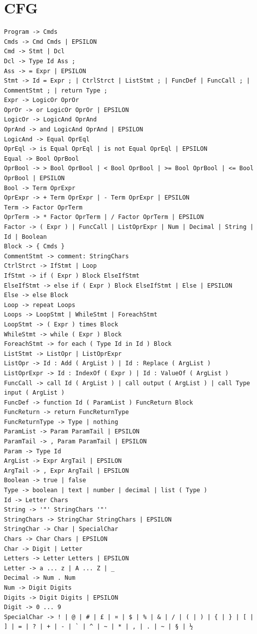 \chapter{CFG} \label{chap:appa}
\begin{lstlisting}[language=scriptkid, label={list:BNFCFG},caption=Context-free grammar for \lang in BNF form]
Program -> Cmds   
Cmds -> Cmd Cmds | EPSILON   
Cmd -> Stmt | Dcl   
Dcl -> Type Id Ass ;   
Ass -> = Expr | EPSILON   
Stmt -> Id = Expr ; | CtrlStrct | ListStmt ; | FuncDef | FuncCall ; | CommentStmt ; | return Type ; 
Expr -> LogicOr OprOr   
OprOr -> or LogicOr OprOr | EPSILON   
LogicOr -> LogicAnd OprAnd   
OprAnd -> and LogicAnd OprAnd | EPSILON   
LogicAnd -> Equal OprEql   
OprEql -> is Equal OprEql | is not Equal OprEql | EPSILON   
Equal -> Bool OprBool   
OprBool -> > Bool OprBool | < Bool OprBool | >= Bool OprBool | <= Bool OprBool | EPSILON   
Bool -> Term OprExpr   
OprExpr -> + Term OprExpr | - Term OprExpr | EPSILON   
Term -> Factor OprTerm   
OprTerm -> * Factor OprTerm | / Factor OprTerm | EPSILON 
Factor -> ( Expr ) | FuncCall | ListOprExpr | Num | Decimal | String | Id | Boolean 
Block -> { Cmds } 
CommentStmt -> comment: StringChars 
CtrlStrct -> IfStmt | Loop   
IfStmt -> if ( Expr ) Block ElseIfStmt   
ElseIfStmt -> else if ( Expr ) Block ElseIfStmt | Else | EPSILON   
Else -> else Block   
Loop -> repeat Loops   
Loops -> LoopStmt | WhileStmt | ForeachStmt   
LoopStmt -> ( Expr ) times Block 
WhileStmt -> while ( Expr ) Block   
ForeachStmt -> for each ( Type Id in Id ) Block   
ListStmt -> ListOpr | ListOprExpr 
ListOpr -> Id : Add ( ArgList ) | Id : Replace ( ArgList ) 
ListOprExpr -> Id : IndexOf ( Expr ) | Id : ValueOf ( ArgList ) 
FuncCall -> call Id ( ArgList ) | call output ( ArgList ) | call Type input ( ArgList ) 
FuncDef -> function Id ( ParamList ) FuncReturn Block   
FuncReturn -> return FuncReturnType   
FuncReturnType -> Type | nothing   
ParamList -> Param ParamTail | EPSILON   
ParamTail -> , Param ParamTail | EPSILON   
Param -> Type Id   
ArgList -> Expr ArgTail | EPSILON   
ArgTail -> , Expr ArgTail | EPSILON   
Boolean -> true | false   
Type -> boolean | text | number | decimal | list ( Type )   
Id -> Letter Chars 
String -> '"' StringChars '"'  
StringChars -> StringChar StringChars | EPSILON 
StringChar -> Char | SpecialChar  
Chars -> Char Chars | EPSILON  
Char -> Digit | Letter   
Letters -> Letter Letters | EPSILON   
Letter -> a ... z | A ... Z | _   
Decimal -> Num . Num 
Num -> Digit Digits   
Digits -> Digit Digits | EPSILON   
Digit -> 0 ... 9 
SpecialChar -> ! | @ | # | £ | ¤ | $ | % | & | / | ( | ) | { | } | [ | ] | = | ? | + | - | ` | ^ | ~ | * | , | . | ~ | § | ½ 
\end{lstlisting}  


